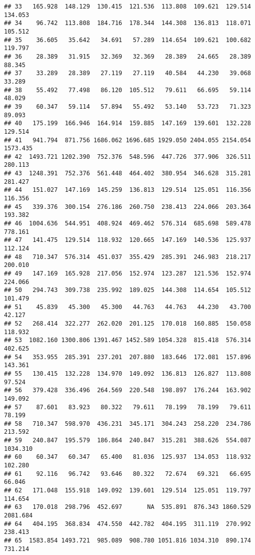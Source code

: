 \documentclass[
]{article}
\begin{document}
\begin{verbatim}
## 33   165.928  148.129  130.415  121.536  113.808  109.621  129.514  134.053
## 34    96.742  113.808  184.716  178.344  144.308  136.813  118.071  105.512
## 35    36.605   35.642   34.691   57.289  114.654  109.621  100.682  119.797
## 36    28.389   31.915   32.369   32.369   28.389   24.665   28.389   88.345
## 37    33.289   28.389   27.119   27.119   40.584   44.230   39.068   33.289
## 38    55.492   77.498   86.120  105.512   79.611   66.695   59.114   48.029
## 39    60.347   59.114   57.894   55.492   53.140   53.723   71.323   89.093
## 40   175.199  166.946  164.914  159.885  147.169  139.601  132.228  129.514
## 41   941.794  871.756 1686.062 1696.685 1929.050 2404.055 2154.054 1573.435
## 42  1493.721 1202.390  752.376  548.596  447.726  377.906  326.511  280.113
## 43  1248.391  752.376  561.448  464.402  380.954  346.628  315.281  281.427
## 44   151.027  147.169  145.259  136.813  129.514  125.051  116.356  116.356
## 45   339.376  300.154  276.186  260.750  238.413  224.066  203.364  193.382
## 46  1004.636  544.951  408.924  469.462  576.314  685.698  589.478  778.161
## 47   141.475  129.514  118.932  120.665  147.169  140.536  125.937  112.124
## 48   710.347  576.314  451.037  355.429  285.391  246.983  218.217  200.010
## 49   147.169  165.928  217.056  152.974  123.287  121.536  152.974  224.066
## 50   294.743  309.738  235.992  189.025  144.308  114.654  105.512  101.479
## 51    45.839   45.300   45.300   44.763   44.763   44.230   43.700   42.127
## 52   268.414  322.277  262.020  201.125  170.018  160.885  150.058  118.932
## 53  1082.160 1300.806 1391.467 1452.589 1054.328  815.418  576.314  402.625
## 54   353.955  285.391  237.201  207.880  183.646  172.081  157.896  143.361
## 55   130.415  132.228  134.970  149.092  136.813  126.827  113.808   97.524
## 56   379.428  336.496  264.569  220.548  198.897  176.244  163.902  149.092
## 57    87.601   83.923   80.322   79.611   78.199   78.199   79.611   78.199
## 58   710.347  598.970  436.231  345.171  304.243  258.220  234.786  213.592
## 59   240.847  195.579  186.864  240.847  315.281  388.626  554.087 1034.310
## 60    60.347   60.347   65.400   81.036  125.937  134.053  118.932  102.280
## 61    92.116   96.742   93.646   80.322   72.674   69.321   66.695   66.046
## 62   171.048  155.918  149.092  139.601  129.514  125.051  119.797  114.654
## 63   170.018  298.796  452.697       NA  535.891  876.343 1860.529 2081.684
## 64   404.195  368.834  474.550  442.782  404.195  311.119  270.992  238.413
## 65  1583.854 1493.721  985.089  908.780 1051.816 1034.310  890.174  731.214

\end{verbatim}
\end{document}
